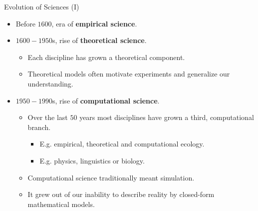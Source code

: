 \begin{frame}{Evolution of Sciences (I)}
	\begin{itemize}
		\item Before $1600$, era of \textbf{empirical science}.
		\item $1600-1950$s, rise of \textbf{theoretical science}.
		      \begin{itemize}
			      \item Each discipline has grown a theoretical component.
			      \item Theoretical models often motivate experiments and generalize
			            our understanding.
		      \end{itemize}
		\item $1950-1990$s, rise of \textbf{computational science}.
		      \begin{itemize}
			      \item Over the last $50$ years most disciplines have grown a third,
			            computational branch.
			            \begin{itemize}
				            \item E.g. empirical, theoretical and computational ecology.
				            \item E.g. physics, linguistics or biology.
			            \end{itemize}
			      \item Computational science traditionally meant simulation.
			      \item It grew out of our inability to describe reality by
			            closed-form mathematical models.
		      \end{itemize}
	\end{itemize}
\end{frame}

